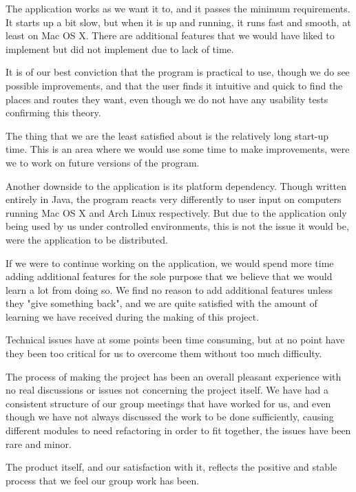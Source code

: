 The application works as we want it to, and it passes the minimum requirements. It starts up a bit slow, but when it is up and running, it runs fast and smooth, at least on Mac OS X. There are additional features that we would have liked to implement but did not implement due to lack of time.

It is of our best conviction that the program is practical to use, though we do see possible improvements, and that the user finds it intuitive and quick to find the places and routes they want, even though we do not have any usability tests confirming this theory.

The thing that we are the least satisfied about is the relatively long start-up time. This is an area where we would use some time to make improvements, were we to work on future versions of the program.

Another downside to the application is its platform dependency. Though written entirely in Java, the program reacts very differently to user input on computers running Mac OS X and Arch Linux respectively. But due to the application only being used by us under controlled environments, this is not the issue it would be, were the application to be distributed.

If we were to continue working on the application, we would spend more time adding additional features for the sole purpose that we believe that we would learn a lot from doing so. We find no reason to add additional features unless they "give something back", and we are quite satisfied with the amount of learning we have received during the making of this project.

Technical issues have at some points been time consuming, but at no point have they been too critical for us to overcome them without too much difficulty.

The process of making the project has been an overall pleasant experience with no real discussions or issues not concerning the project itself. We have had a consistent structure of our group meetings that have worked for us, and even though we have not always discussed the work to be done sufficiently, causing different modules to need refactoring in order to fit together, the issues have been rare and minor.

The product itself, and our satisfaction with it, reflects the positive and stable process that we feel our group work has been.
